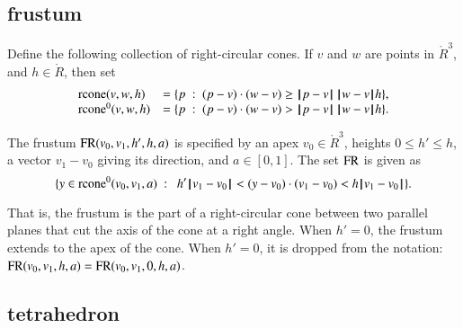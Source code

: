 \subsection{frustum}
%

\begin{definition}[rcone]
%
Define the following collection of right-circular cones.
If $v$ and $w$ are points in $\ring{R}^3$, and
  $h\in\ring{R}$, then set
  $$\begin{array}{lll}
    {\operatorname{rcone}}(v,w,h) &= \{p\ :\  (p-v)\cdot (w-v) \ge {\hskip0.1em|\hskip-0.15em|\hskip0.1em}p - v{\hskip0.1em|\hskip-0.15em|\hskip0.1em}\,{\hskip0.1em|\hskip-0.15em|\hskip0.1em}w - v{\hskip0.1em|\hskip-0.15em|\hskip0.1em} h\},\\
    {\operatorname{rcone}}^0(v,w,h) &= \{p\ :\  (p-v)\cdot (w-v) > {\hskip0.1em|\hskip-0.15em|\hskip0.1em}p - v{\hskip0.1em|\hskip-0.15em|\hskip0.1em}\,{\hskip0.1em|\hskip-0.15em|\hskip0.1em}w - v{\hskip0.1em|\hskip-0.15em|\hskip0.1em} h\}.\\
    \end{array}
    $$
\end{definition}
%
%
%
%


\begin{definition}[frustum, FR] The frustum
${\operatorname{FR}}(v_0,v_1,h',h,a)$ is specified by an apex $v_0\in\ring{R}^3$, heights
$0\le h'\le h$, a vector $v_1-v_0$ giving its direction, and
$a\in[0,1]$. The set ${\operatorname{FR}}$ is given as
    $$
    \{ y \in\op{rcone}^0(v_0,v_1,a) \mid \ 
       h'\norm{v_1}{v_0} < (y-v_0) \cdot (v_1-v_0) < h\norm{v_1}{v_0} \}.
    $$
%
%
%
%
%
\end{definition}

That is, the frustum is the part of a right-circular cone between two
parallel planes that cut the axis of the cone at a right angle.
When $h'=0$, the frustum extends to the apex of the cone.
When $h'=0$, it is dropped from the notation: ${\operatorname{FR}}(v_0,v_1,h,a)={\operatorname{FR}}(v_0,v_1,0,h,a)$.

\subsection{tetrahedron}
%


